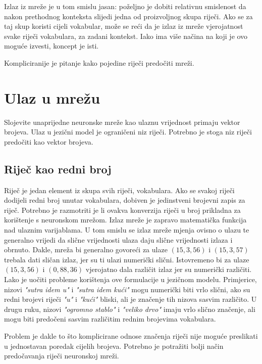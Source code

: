 \documentclass[times, utf8, diplomski, numeric]{fer}
\begin{document}
Izlaz iz mreže je u tom smislu jasan: poželjno je dobiti relativnu smislenost da nakon prethodnog konteksta slijedi jedna od proizvoljnog skupa riječi. Ako se za taj skup koristi cijeli vokabular, može se reći da je izlaz iz mreže vjerojatnost svake riječi vokabulara, za zadani kontekst. Iako ima više načina na koji je ovo moguće izvesti, koncept je isti.

Kompliciranije je pitanje kako pojedine riječi predočiti mreži.

\section{Ulaz u mrežu}
\label{sec:lnnet_input}
Slojevite unaprijedne neuronske mreže kao ulaznu vrijednost primaju vektor brojeva. Ulaz u jezični model je ograničeni niz riječi. Potrebno je stoga niz riječi predočiti kao vektor brojeva.

\subsection{Riječ kao redni broj}

Riječ je jedan element iz skupa svih riječi, vokabulara. Ako se svakoj riječi dodijeli redni broj unutar vokabulara, dobiven je jedinstveni brojevni zapis za riječ. Potrebno je razmotriti je li ovakva konverzija riječi u broj prikladna za korištenje s neuronskom mrežom. Izlaz mreže je zapravo matematička funkcija nad ulaznim varijablama. U tom smislu se izlaz mreže mjenja ovisno o ulazu te generalno vrijedi da slične vrijednosti ulaza daju slične vrijednosti izlaza i obrnuto. Dakle, mreža bi generalno govoreći za ulaze $(15, 3, 56)$ i $(15, 3, 57)$ trebala dati sličan izlaz, jer su ti ulazi numerički slični. Istovremeno bi za ulaze $(15, 3, 56)$ i $(0, 88, 36)$ vjerojatno dala različit izlaz jer su numerički različiti. Lako je uočiti probleme korištenja ove formulacije u jezičnom modelu. Primjerice, nizovi \textit{"sutra idem u"} i \textit{"sutra idem kući"} mogu numerički biti vrlo slični, ako su redni brojevi riječi \textit{"u"} i \textit{"kući"} bliski, ali je značenje tih nizova sasvim različito. U drugu ruku, nizovi \textit{"ogromno stablo"} i \textit{"veliko drvo"} imaju vrlo slično značenje, ali mogu biti predočeni sasvim različitim rednim brojevima vokabulara.

Problem je dakle to što komplicirane odnose značenja riječi nije moguće preslikati u jednostavan poredak cijelih brojeva. Potrebno je potražiti bolji način predočavanja riječi neuronskoj mreži.
\end{document}
